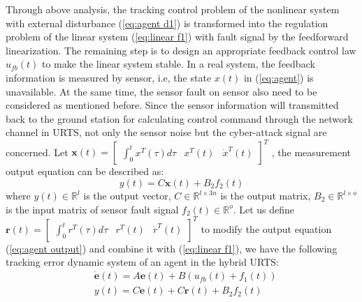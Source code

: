 \documentclass{ieeeaccess}
\begin{document}
Through above analysis, the tracking control problem of the nonlinear system with external disturbance (\ref{eq:agent d1}) is transformed into the regulation problem of the linear system (\ref{eq:linear f1}) with fault signal by the feedforward linearization. The remaining step is to design an appropriate feedback control law $u_{fb}(t)$ to make the linear system stable. In a real system, the feedback information is measured by sensor, i.e, the state $x(t)$ in (\ref{eq:agent}) is unavailable. At the same time, the sensor fault on sensor also need to be considered as mentioned before. Since the sensor information will transmitted back to the ground station for calculating control command through the network channel in URTS, not only the sensor noise but the cyber-attack signal are concerned. Let $\pmb{x}(t)=\begin{bmatrix}
    \int_{0}^{t}x^T(\tau)d\tau & x^T(t) & \dot{x}^T(t)
\end{bmatrix}^T$
, the measurement output equation can be described as:
\begin{equation} \label{eq:agent output}
    y(t) = C\pmb{x}(t) + B_2f_2(t)
\end{equation}
where $y(t)\in\mathbb{R}^{l}$ is the output vector, $C\in\mathbb{R}^{l\times 3n}$ is the output matrix, $B_2\in\mathbb{R}^{l\times o}$ is the input matrix of sensor fault signal $f_2(t)\in\mathbb{R}^o$. Let us define $\pmb{r}(t)=\begin{bmatrix}
    \int_{0}^{t}r^T(\tau)d\tau & r^T(t) & \dot{r}^T(t)
\end{bmatrix}^T$ to modify the output equation (\ref{eq:agent output}) and combine it with (\ref{eq:linear f1}), we have the following tracking error dynamic system of an agent in the hybrid URTS:
\begin{equation} \label{eq:error}
    \begin{split}
        & \dot{\pmb{e}}(t)=A\pmb{e}(t)+B(u_{fb}(t)+f_1(t)) \\
        & y(t) = C\pmb{e}(t) + C\pmb{r}(t) + B_2f_2(t)   
    \end{split}  
\end{equation}
\end{document}
